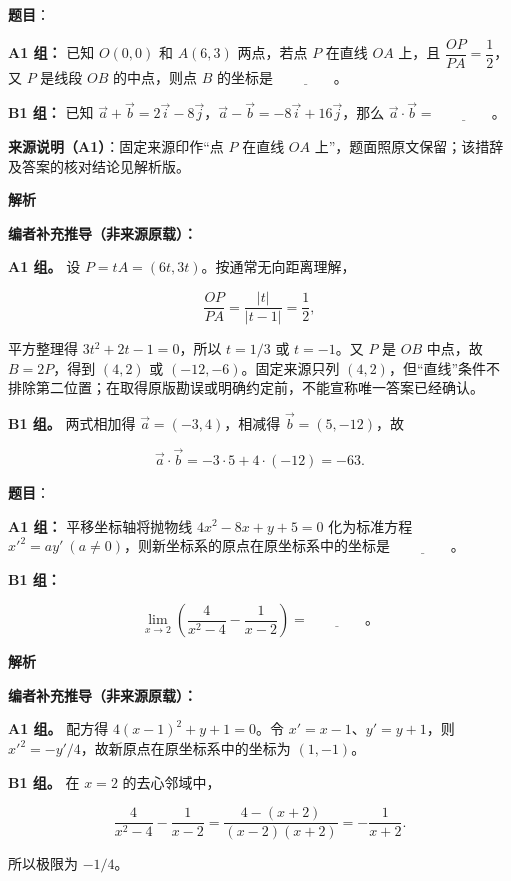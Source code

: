 \begin{answer}

\textbf{题目}：

\textbf{A1 组：} 已知 $O(0,0)$ 和 $A(6,3)$ 两点，若点 $P$ 在直线 $OA$ 上，且 $\dfrac{OP}{PA}=\dfrac12$，又 $P$ 是线段 $OB$ 的中点，则点 $B$ 的坐标是 $\underline{\qquad\qquad}$。

\textbf{B1 组：} 已知 $\vec a+\vec b=2\vec i-8\vec j$，$\vec a-\vec b=-8\vec i+16\vec j$，那么 $\vec a\cdot\vec b=\underline{\qquad\qquad}$。

\begin{gktip}
\textbf{来源说明（A1）}：固定来源印作“点 $P$ 在直线 $OA$ 上”，题面照原文保留；该措辞及答案的核对结论见解析版。
\end{gktip}

\textbf{解析}

\textbf{编者补充推导（非来源原载）：}

\textbf{A1 组。} 设 $P=tA=(6t,3t)$。按通常无向距离理解，

\nopagebreak[4]
\[\frac{OP}{PA}=\frac{|t|}{|t-1|}=\frac12,\]

平方整理得 $3t^2+2t-1=0$，所以 $t=1/3$ 或 $t=-1$。又 $P$ 是 $OB$ 中点，故 $B=2P$，得到 $(4,2)$ 或 $(-12,-6)$。固定来源只列 $(4,2)$，但“直线”条件不排除第二位置；在取得原版勘误或明确约定前，不能宣称唯一答案已经确认。

\textbf{B1 组。} 两式相加得 $\vec a=(-3,4)$，相减得 $\vec b=(5,-12)$，故

\nopagebreak[4]
\[\vec a\cdot\vec b=-3\cdot5+4\cdot(-12)=-63.\]


\end{answer}
\begin{answer}

\textbf{题目}：

\textbf{A1 组：} 平移坐标轴将抛物线 $4x^2-8x+y+5=0$ 化为标准方程 $x'^2=ay'\ (a\ne0)$，则新坐标系的原点在原坐标系中的坐标是 $\underline{\qquad\qquad}$。

\textbf{B1 组：}

\nopagebreak[4]
\[
\lim_{x\to2}\left(\dfrac{4}{x^2-4}-\dfrac{1}{x-2}\right)=\underline{\qquad\qquad}\text{。}
\]

\textbf{解析}

\textbf{编者补充推导（非来源原载）：}

\textbf{A1 组。} 配方得 $4(x-1)^2+y+1=0$。令 $x'=x-1$、$y'=y+1$，则 $x'^2=-y'/4$，故新原点在原坐标系中的坐标为 $(1,-1)$。

\textbf{B1 组。} 在 $x=2$ 的去心邻域中，

\nopagebreak[4]
\[\frac4{x^2-4}-\frac1{x-2}=\frac{4-(x+2)}{(x-2)(x+2)}=-\frac1{x+2}.\]

所以极限为 $-1/4$。


\end{answer}
